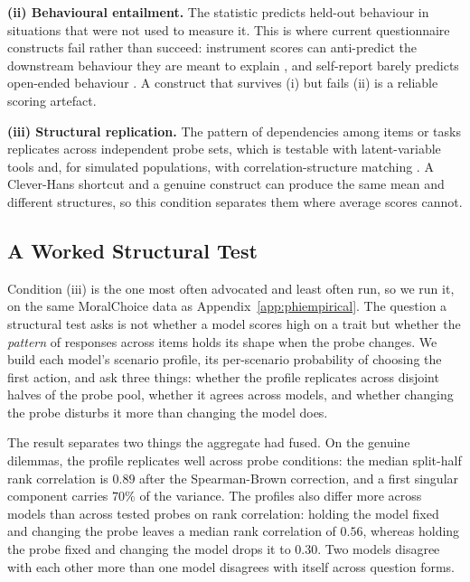 \documentclass[11pt]{article}
\begin{document}
\textbf{(ii) Behavioural entailment.} The statistic predicts held-out behaviour
in situations that were not used to measure it. This is where current
questionnaire constructs fail rather than succeed: instrument scores can
anti-predict the downstream behaviour they are meant to explain
\cite{jung2025psychometric}, and self-report barely predicts open-ended
behaviour \cite{song2025psychometric}. A construct that survives (i) but fails
(ii) is a reliable scoring artefact.

\textbf{(iii) Structural replication.} The pattern of dependencies among items
or tasks replicates across independent probe sets, which is testable with
latent-variable tools \cite{rodriguez2021irt} and, for simulated populations,
with correlation-structure matching \cite{li2025silicon}. A Clever-Hans shortcut
and a genuine construct can produce the same mean and different structures, so
this condition separates them where average scores cannot.

\subsection{A Worked Structural Test}
\label{app:structural}

Condition (iii) is the one most often advocated and least often run, so we run
it, on the same MoralChoice data as Appendix~\ref{app:phiempirical}. The
question a structural test asks is not whether a model scores high on a trait
but whether the \emph{pattern} of responses across items holds its shape when
the probe changes. We build each model's scenario profile, its per-scenario
probability of choosing the first action, and ask three things: whether the
profile replicates across disjoint halves of the probe pool, whether it agrees
across models, and whether changing the probe disturbs it more than changing the
model does.

The result separates two things the aggregate had fused. On the genuine
dilemmas, the profile replicates well across probe conditions: the median
split-half rank correlation is $0.89$ after the Spearman-Brown correction, and a
first singular component carries $70\%$ of the variance. The profiles also
differ more across models than across tested probes on rank correlation: holding the model fixed
and changing the probe leaves a median rank correlation of $0.56$, whereas
holding the probe fixed and changing the model drops it to $0.30$. Two models
disagree with each other more than one model disagrees with itself across
question forms.
\end{document}
